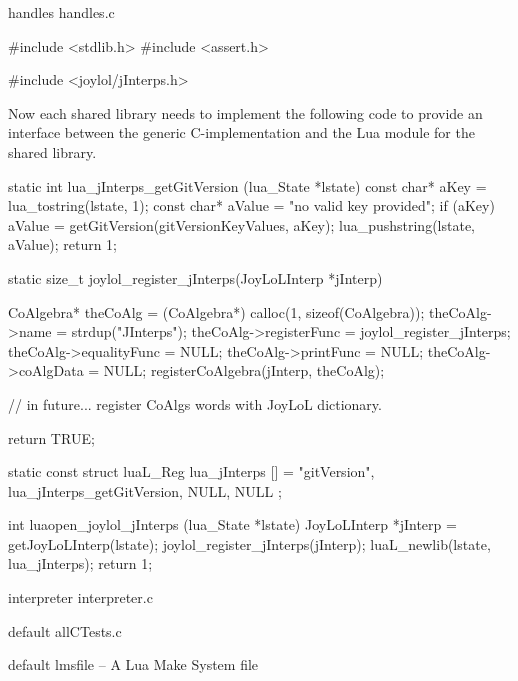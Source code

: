 \createCCodeFile%
  {handles}%
  {handles.c}%
  {}

\startCCode
#include <stdlib.h>
#include <assert.h>

#include <joylol/jInterps.h>
\stopCCode

Now each shared library needs to implement the following code to provide 
an interface between the generic C-implementation and the Lua module for 
the shared library. 

\startCCode
static int lua_jInterps_getGitVersion (lua_State *lstate) {
  const char* aKey   = lua_tostring(lstate, 1);
  const char* aValue = "no valid key provided";
  if (aKey) aValue = getGitVersion(gitVersionKeyValues, aKey);
  lua_pushstring(lstate, aValue);
  return 1;
}

static size_t joylol_register_jInterps(JoyLoLInterp *jInterp) {
  CoAlgebra* theCoAlg    = (CoAlgebra*) calloc(1, sizeof(CoAlgebra));
  theCoAlg->name         = strdup("JInterps");
  theCoAlg->registerFunc = joylol_register_jInterps;
  theCoAlg->equalityFunc = NULL;
  theCoAlg->printFunc    = NULL;
  theCoAlg->coAlgData    = NULL;
  registerCoAlgebra(jInterp, theCoAlg);
  
  // in future... register CoAlgs words with JoyLoL dictionary. 
  
  return TRUE;
}

static const struct luaL_Reg lua_jInterps [] = {
  {"gitVersion", lua_jInterps_getGitVersion},
  {NULL, NULL}
};

int luaopen_joylol_jInterps (lua_State *lstate) {
  JoyLoLInterp *jInterp = getJoyLoLInterp(lstate);
  joylol_register_jInterps(jInterp);
  luaL_newlib(lstate, lua_jInterps);
  return 1;
}
\stopCCode

\createCCodeFile%
  {interpreter}%
  {interpreter.c}%
  {}

\createCTestFile%
  {default}%
  {allCTests.c}%
  {}





\createLmsfileFile%
  {default}%
  {lmsfile}%
  {-- A Lua Make System file}

